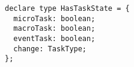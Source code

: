 \begin{verbatim}
declare type HasTaskState = {
  microTask: boolean;
  macroTask: boolean;
  eventTask: boolean;
  change: TaskType;
};
\end{verbatim}
